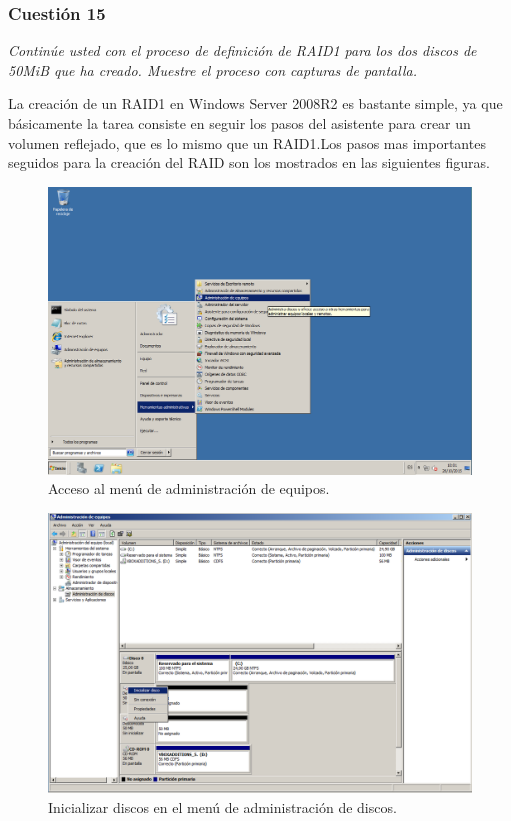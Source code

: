 \subsubsection{Cuestión 15}
\textit{Continúe usted con el proceso de definición de RAID1 para los dos discos de 50MiB que ha creado. Muestre el proceso con capturas de pantalla.}\newline

La creación de un RAID1 en Windows Server 2008R2 es bastante simple, ya que básicamente la tarea consiste en seguir los pasos del asistente para crear un volumen reflejado, que es lo mismo que un RAID1.Los pasos mas importantes seguidos para la creación del RAID son los mostrados en las siguientes figuras. \cite{winraid}

\begin{figure}[H]
    \begin{center}
    \advance\leftskip-2.3cm
        \includegraphics[scale=0.45]{Imagenes/paso1}
        \caption{Acceso al menú de administración de equipos.}
        \label{fig10}
    \end{center}
\end{figure}

\begin{figure}[H]
    \begin{center}
    \advance\leftskip-2cm
        \includegraphics[scale=0.45]{Imagenes/paso2}
        \caption{Inicializar discos en el menú de administración de discos.}
        \label{fig11}
    \end{center}
\end{figure}

